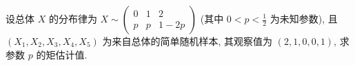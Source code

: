 \documentclass[padp]{ExBook}
\begin{document}
\clearpage












\begin{qitems}

    \begin{bbox}
        \qitem  设总体 $X$ 的分布律为 $X \sim \begin{pmatrix} 0 & 1 & 2 \\ p & p & 1-2p \end{pmatrix}$ (其中 $0 < p < \frac{1}{2}$ 为未知参数), 且 $(X_1, X_2, X_3, X_4, X_5)$ 为来自总体的简单随机样本, 其观察值为 $(2, 1, 0, 0, 1)$, 求参数 $p$ 的矩估计值.
    \end{bbox}
    

\end{qitems}
\end{document}
